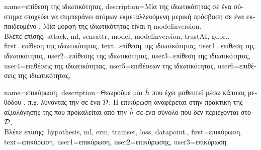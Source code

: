 {name={\foreignlanguage{greek}{επίθεση της ιδιωτικότητας}},
	description={\foreignlanguage{greek}{Μία}  
		\foreignlanguage{greek}{της ιδιωτικότητας σε ένα σύστημα}  \foreignlanguage{greek}{στοχεύει 
		να συμπεράνει}  \foreignlanguage{greek}{ατόμων εκμεταλλευόμενη μερική πρόσβαση σε 
		ένα εκπαιδευμένο}  . \foreignlanguage{greek}{Μία μορφή}  
		\foreignlanguage{greek}{της ιδιωτικότητας εί\-ναι η} \gls{modelinversion}.\\
		\foreignlanguage{greek}{Βλέπε επίσης:} \gls{attack}, \gls{ml}, \gls{sensattr}, \gls{model}, \gls{modelinversion}, \gls{trustAI}, \gls{gdpr}.},
	first={\foreignlanguage{greek}{επίθεση της ιδιωτικότητας}},
	text={\foreignlanguage{greek}{επίθεση της ιδιωτικότητας}},
	user1={\foreignlanguage{greek}{επίθεση της ιδιωτικότητας}}, %
  	user2={\foreignlanguage{greek}{επίθεσης της ιδιωτικότητας}}, %
	user3={\foreignlanguage{greek}{επίθεση της ιδιωτικότητας}}, %
  	user4={\foreignlanguage{greek}{επιθέσεις της ιδιωτικότητας}}, %
	user5={\foreignlanguage{greek}{επιθέσεων της ιδιωτικότητας}}, %
	user6={\foreignlanguage{greek}{επιθέσεις της ιδιωτικότητας}}, %
}

{name={\foreignlanguage{greek}{επικύρωση}},
	description={\foreignlanguage{greek}{Θεωρούμε μία} 
		 $\hat{h}$ 
		\foreignlanguage{greek}{που έχει μαθευτεί μέσω κάποιας μεθόδου} , \foreignlanguage{greek}{π.χ. λύνοντας την} 
		 \foreignlanguage{greek}{σε ένα}  $\mathcal{D}$. 
		\foreignlanguage{greek}{Η επικύρωση αναφέρεται στην πρακτική της αξιολόγησης της}  
		\foreignlanguage{greek}{που προκαλείται από την}  $\hat{h}$ \foreignlanguage{greek}{σε ένα 
		σύνολο}  \foreignlanguage{greek}{που δεν περιέχονται στο}  $\mathcal{D}$.\\
		\foreignlanguage{greek}{Βλέπε επίσης:} \gls{hypothesis}, \gls{ml}, \gls{erm}, \gls{trainset}, \gls{loss}, \gls{datapoint}.},
	first={\foreignlanguage{greek}{επικύρωση}},
	text={\foreignlanguage{greek}{επικύρωση}},
	user1={\foreignlanguage{greek}{επικύρωση}}, %
	user2={\foreignlanguage{greek}{επικύρωσης}}, %
	user3={\foreignlanguage{greek}{επικύρωση}} %
}

